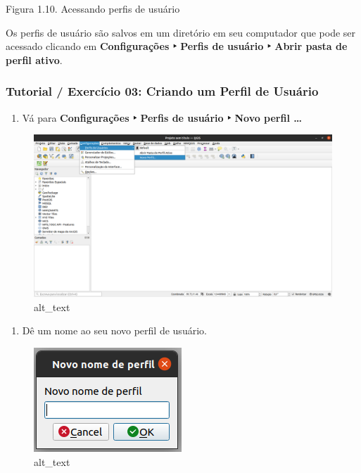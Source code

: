 \documentclass[
]{book}
\providecommand{\tightlist}{%
  \setlength{\itemsep}{0pt}\setlength{\parskip}{0pt}}
\begin{document}
Figura 1.10. Acessando perfis de usuário

Os perfis de usuário são salvos em um diretório em seu computador que pode ser acessado clicando em \textbf{Configurações ‣ Perfis de usuário ‣ Abrir pasta de perfil ativo}.

\hypertarget{tutorial-exercuxedcio-03-criando-um-perfil-de-usuuxe1rio}{%
\subsubsection{\texorpdfstring{\textbf{Tutorial / Exercício 03: Criando um Perfil de Usuário}}{Tutorial / Exercício 03: Criando um Perfil de Usuário}}\label{tutorial-exercuxedcio-03-criando-um-perfil-de-usuuxe1rio}}

\begin{enumerate}
\def\labelenumi{\arabic{enumi}.}
\tightlist
\item
  Vá para \textbf{Configurações ‣ Perfis de usuário ‣ Novo perfil \ldots{}}
\end{enumerate}

\begin{figure}
\centering
\includegraphics{media/modulo1/user-profiles-2.png}
\caption{alt\_text}
\end{figure}

\begin{enumerate}
\def\labelenumi{\arabic{enumi}.}
\setcounter{enumi}{1}
\tightlist
\item
  Dê um nome ao seu novo perfil de usuário.
\end{enumerate}

\begin{figure}
\centering
\includegraphics{media/modulo1/user-profiles-3.png}
\caption{alt\_text}
\end{figure}
\end{document}
